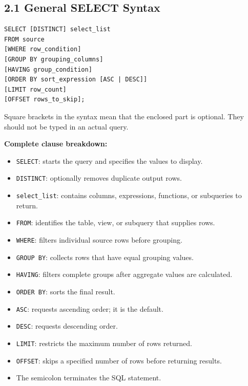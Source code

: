 \documentclass[12pt,a4paper]{article}
\begin{document}
\subsection*{2.1 General SELECT Syntax}
\begin{verbatim}
SELECT [DISTINCT] select_list
FROM source
[WHERE row_condition]
[GROUP BY grouping_columns]
[HAVING group_condition]
[ORDER BY sort_expression [ASC | DESC]]
[LIMIT row_count]
[OFFSET rows_to_skip];
\end{verbatim}

\noindent Square brackets in the syntax mean that the enclosed part is optional. They should not
be typed in an actual query.

\noindent\textbf{Complete clause breakdown:}
\begin{itemize}
    \item \texttt{SELECT}: starts the query and specifies the values to display.
    \item \texttt{DISTINCT}: optionally removes duplicate output rows.
    \item \texttt{select\_list}: contains columns, expressions, functions, or subqueries to return.
    \item \texttt{FROM}: identifies the table, view, or subquery that supplies rows.
    \item \texttt{WHERE}: filters individual source rows before grouping.
    \item \texttt{GROUP BY}: collects rows that have equal grouping values.
    \item \texttt{HAVING}: filters complete groups after aggregate values are calculated.
    \item \texttt{ORDER BY}: sorts the final result.
    \item \texttt{ASC}: requests ascending order; it is the default.
    \item \texttt{DESC}: requests descending order.
    \item \texttt{LIMIT}: restricts the maximum number of rows returned.
    \item \texttt{OFFSET}: skips a specified number of rows before returning results.
    \item The semicolon terminates the SQL statement.
\end{itemize}
\end{document}
